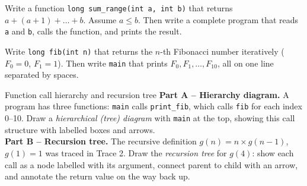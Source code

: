 \documentclass[11pt]{article}
\begin{document}
\begin{writecode}
Write a function \texttt{long sum\_range(int a, int b)} that returns
$a + (a+1) + \dots + b$. Assume $a \leq b$. Then write a complete program that reads
\texttt{a} and \texttt{b}, calls the function, and prints the result.
\end{writecode}

\begin{writecode}
Write \texttt{long fib(int n)} that returns the $n$-th Fibonacci number iteratively
($F_0 = 0$, $F_1 = 1$). Then write \texttt{main} that prints $F_0, F_1, \dots, F_{10}$,
all on one line separated by spaces.
\end{writecode}

\begin{drawex}{Function call hierarchy and recursion tree}
\textbf{Part A -- Hierarchy diagram.}
A program has three functions: \texttt{main} calls \texttt{print\_fib},
which calls \texttt{fib} for each index 0--10.
Draw a \emph{hierarchical (tree) diagram} with \texttt{main} at the top, showing
this call structure with labelled boxes and arrows.\\[6pt]
\textbf{Part B -- Recursion tree.}
The recursive definition $g(n) = n \times g(n-1)$, $g(1)=1$ was traced in Trace 2.
Draw the \emph{recursion tree} for $g(4)$: show each call as a node labelled with its
argument, connect parent to child with an arrow, and annotate the return value on
the way back up.
\end{drawex}
\end{document}
